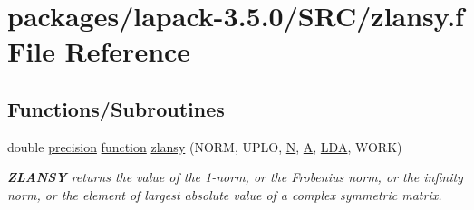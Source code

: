 \hypertarget{zlansy_8f}{}\section{packages/lapack-\/3.5.0/\+S\+R\+C/zlansy.f File Reference}
\label{zlansy_8f}
\subsection*{Functions/\+Subroutines}
\begin{DoxyCompactItemize}
\item 
double \hyperlink{numinquire_8h_a2c8e616467665d0b2814d4c1589ba74e}{precision} \hyperlink{afunc_8m_a7b5e596df91eadea6c537c0825e894a7}{function} \hyperlink{group__complex16SYauxiliary_gae1d67e9c7403f3d6e2c5db6073b014d3}{zlansy} (N\+O\+R\+M, U\+P\+L\+O, \hyperlink{polmisc_8c_a0240ac851181b84ac374872dc5434ee4}{N}, \hyperlink{classA}{A}, \hyperlink{example__user_8c_ae946da542ce0db94dced19b2ecefd1aa}{L\+D\+A}, W\+O\+R\+K)
\begin{DoxyCompactList}\small\item\em {\bfseries Z\+L\+A\+N\+S\+Y} returns the value of the 1-\/norm, or the Frobenius norm, or the infinity norm, or the element of largest absolute value of a complex symmetric matrix. \end{DoxyCompactList}\end{DoxyCompactItemize}
